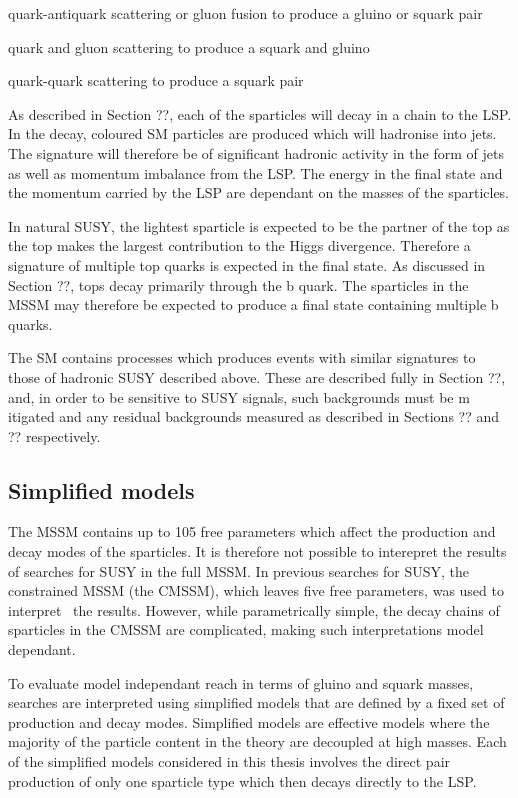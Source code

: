 \item quark-antiquark scattering or gluon fusion to produce a gluino or squark pair
\item quark and gluon scattering to produce a squark and gluino
\item quark-quark scattering to produce a squark pair

As described in Section ??, each of the sparticles will decay in a chain to the LSP. 
In the decay, coloured SM particles are produced which will hadronise into jets.
The signature will therefore be of significant hadronic activity in 
the form of jets as well as momentum imbalance from the LSP. The energy in
the final state and the momentum carried by the LSP are dependant on the masses
of the sparticles.

In natural SUSY, the lightest sparticle is expected to be the partner of the top
as the top makes the largest contribution to the Higgs divergence. Therefore a signature
of multiple top quarks is expected in the final state. As discussed in Section ??, tops
decay primarily through the b quark. The sparticles in the MSSM may therefore be expected
to produce a final state containing multiple b quarks.

The SM contains processes which produces events with similar signatures to 
those of hadronic SUSY described above. These are described fully in Section ??,
and, in order to be sensitive to SUSY signals, such backgrounds must be m
itigated and any residual backgrounds measured as described in Sections ?? and ??
respectively.

\subsection{Simplified models}

The MSSM contains up to 105 free parameters which affect the production and decay modes of the sparticles.
It is therefore not possible to interepret the results of searches for SUSY in the full MSSM. 
In previous searches for SUSY, the constrained MSSM (the CMSSM), which leaves five free parameters, was 
used to interpret~\cite{} the results. However, while parametrically simple, the decay chains of sparticles 
in the CMSSM are complicated, making such interpretations model dependant. 

To evaluate model independant reach in terms of gluino and squark masses, searches are interpreted using 
simplified models that are defined by a fixed set of production and decay modes.
Simplified models are effective models where the majority of the particle content in the theory 
are decoupled at high masses. Each of the simplified models considered in this thesis involves
the direct pair production of only one sparticle type which then decays directly to the LSP.

